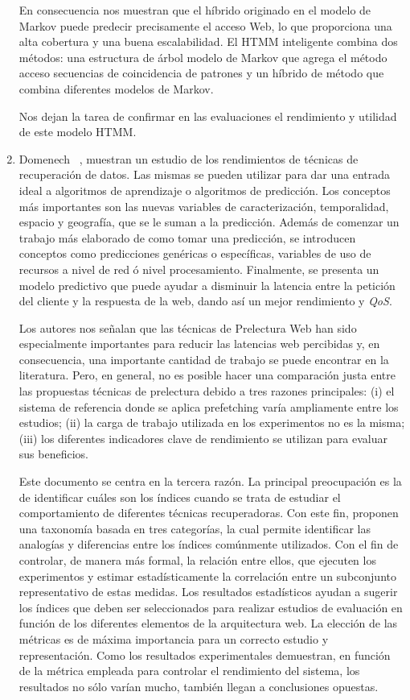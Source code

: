 \begin{enumerate}
  En consecuencia  nos muestran que el híbrido originado en el modelo de Markov puede predecir precisamente el acceso Web, lo que proporciona una alta cobertura y una buena escalabilidad. El HTMM inteligente combina dos métodos: una estructura de árbol modelo de Markov que agrega el método acceso secuencias de coincidencia de patrones y un híbrido de método que combina diferentes modelos de Markov. 
  
  Nos dejan la tarea de confirmar en las evaluaciones el rendimiento y utilidad de este modelo  HTMM.
  
  

  \item Domenech \etal~\cite{Domenech2006}, muestran un estudio de los rendimientos de técnicas de recuperación de datos.
  Las mismas se pueden utilizar para dar una entrada ideal a algoritmos de aprendizaje o algoritmos de predicción. 
  Los conceptos más importantes son las nuevas variables de caracterización, temporalidad, espacio y geografía, que se le suman a la predicción. 
  Además de comenzar un trabajo más elaborado de como tomar una predicción, se introducen conceptos como predicciones genéricas o específicas, variables de uso de recursos a nivel de red ó nivel procesamiento.
  Finalmente, se presenta un modelo predictivo que puede ayudar a disminuir la latencia entre la petición del cliente y la respuesta de la web, dando así un mejor rendimiento y \emph{QoS}.
  
  Los autores nos señalan que las técnicas de Prelectura Web  han sido especialmente importantes para reducir las latencias web percibidas y, en consecuencia, una importante cantidad de trabajo se puede encontrar en la literatura. Pero, en general, no es posible hacer una comparación justa entre las propuestas técnicas de prelectura debido a tres razones principales: (i) el sistema de referencia donde se aplica prefetching varía ampliamente entre los estudios; (ii) la carga de trabajo utilizada en los experimentos no es la misma; (iii) los diferentes indicadores clave de rendimiento se utilizan para evaluar sus beneficios.
  
  Este documento se centra en la tercera razón. La principal preocupación es la de identificar cuáles son los índices cuando se trata de estudiar el comportamiento de diferentes técnicas recuperadoras. Con este fin, proponen una taxonomía basada en tres categorías, la cual permite identificar las analogías y diferencias entre los índices comúnmente utilizados. Con el fin de controlar, de manera más formal, la relación entre ellos, que ejecuten los experimentos y estimar estadísticamente la correlación entre un subconjunto representativo de estas medidas. Los resultados estadísticos  ayudan a sugerir los índices que deben ser seleccionados para realizar estudios de evaluación en función de los diferentes elementos de la arquitectura web.
  La elección de las métricas  es de máxima importancia para un correcto estudio y representación. Como los resultados experimentales demuestran, en función de la métrica empleada para controlar el rendimiento del sistema, los resultados no sólo varían mucho, también llegan a conclusiones opuestas.
  



\end{enumerate}
